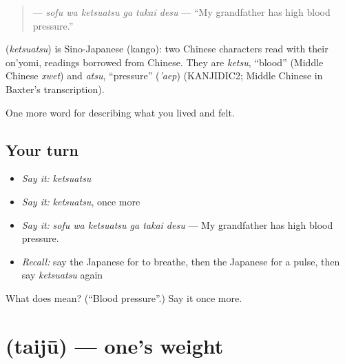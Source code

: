 \begin{quote}
\textbf{  } — \emph{sofu wa ketsuatsu ga takai desu} — \textquotedblleft{}My grandfather has high blood pressure.\textquotedblright{}
\end{quote}

\begin{cousinweb}
\textbf{} (\emph{ketsuatsu}) is Sino-Japanese (kango): two Chinese characters read with their on'yomi, readings borrowed from Chinese. They are \emph{ketsu}, \textquotedblleft{}blood\textquotedblright{} (Middle Chinese \emph{xwet}) and \emph{atsu}, \textquotedblleft{}pressure\textquotedblright{} (\emph{'aep}) (KANJIDIC2; Middle Chinese in Baxter's transcription).
\end{cousinweb}

\begin{grammarlens}[title={What you've built}]
One more word for describing what you lived and felt.
\end{grammarlens}

\subsection*{Your turn}
\begin{itemize}
\raggedright
  \item \emph{Say it:} \emph{ketsuatsu}
  \item \emph{Say it:} \emph{ketsuatsu}, once more
  \item \emph{Say it:} \emph{sofu wa ketsuatsu ga takai desu} — My grandfather has high blood pressure.
  \item \emph{Recall:} say the Japanese for to breathe, then the Japanese for a pulse, then say \emph{ketsuatsu} again
\end{itemize}

\begin{tcolorbox}[breakable,colback=teal!4,colframe=teal!35!black,title={Before you move on}]
What does  mean? (\textquotedblleft{}Blood pressure\textquotedblright{}.) Say it once more.
\end{tcolorbox}
\section[\texorpdfstring{\ja{たいじゅう} (taijū)}{たいじゅう (taijū)}]{ (taijū) — one's weight}

\label{lesson:JA-C444-taijuu}



